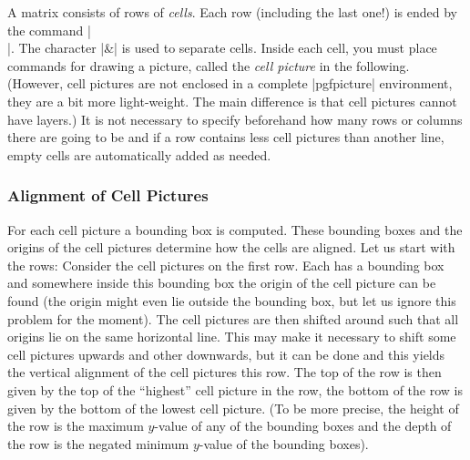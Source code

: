 A matrix consists of rows of \emph{cells}. Each row (including the
last one!) is ended by the command |\\|. The character |&| is used
to separate cells. Inside each cell, you must place commands for
drawing a picture, called the \emph{cell picture} in the
following. (However, cell pictures are not enclosed in a complete
|{pgfpicture}| environment, they are a bit more light-weight. The main
difference is that cell pictures cannot have layers.) It is not
necessary to specify beforehand how many rows or columns there are
going to be and if a row contains less cell pictures than another
line, empty cells are automatically added as needed.


\subsubsection{Alignment of Cell Pictures}

For each cell picture a bounding box is computed. These bounding boxes
and the origins of the cell pictures determine how the cells are
aligned. Let us start with the rows: Consider the cell pictures on the first
row. Each has a bounding box and somewhere inside this bounding box
the origin of the cell picture can be found (the origin might even lie
outside the bounding box, but let us ignore this problem for the
moment). The cell pictures are then shifted around such that all
origins lie on the same horizontal line. This may make it necessary to
shift some cell pictures upwards and other downwards, but it can be
done and this yields the vertical alignment of the cell pictures this
row. The top of the row is then given by the top of the ``highest''
cell picture in the row, the bottom of the row is given by the bottom
of the lowest cell picture. (To be more precise, the height of the row
is the maximum $y$-value of any of the bounding boxes and the depth of
the row is the negated minimum $y$-value of the bounding boxes).

\begin{codeexample}[]
\end{codeexample}

